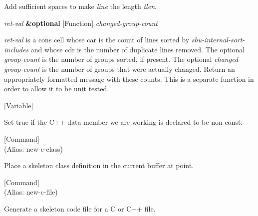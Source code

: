 \begin{doc-string}
Add sufficient spaces to make \emph{line} the length \emph{tlen}.
\end{doc-string}

\vspace{1em}
\noindent
{}
\usebox{\funcname}\emph{ret-val} \textbf{\&optional}
 \hfill [Function]
\hspace*{\wd\funcname}\emph{changed-group-count}

\begin{doc-string}
\emph{ret-val} is a cons cell whose car is the count of lines sorted by
\emph{shu-internal-sort-includes} and whose cdr is the number of duplicate lines
removed.  The optional \emph{group-count} is the number of groups sorted, if present.
The optional \emph{changed-group-count} is the number of groups that were actually
changed.  Return an appropriately formatted message with these counts.  This is
a separate function in order to allow it to be unit tested.
\end{doc-string}

\vspace{1em}
\noindent
{}
\usebox{\funcname}
 \hfill [Variable]

\begin{doc-string}
Set true if the C++ data member we are working is declared to be non-const.
\end{doc-string}

\vspace{1em}
\noindent
{}
\usebox{\funcname}
 \hfill [Command]\\%
 (Alias: new-c-class)

\begin{doc-string}
Place a skeleton class definition in the current buffer at point.
\end{doc-string}

\vspace{1em}
\noindent
{}
\usebox{\funcname}
 \hfill [Command]\\%
 (Alias: new-c-file)

\begin{doc-string}
Generate a skeleton code file for a C or C++ file.
\end{doc-string}

